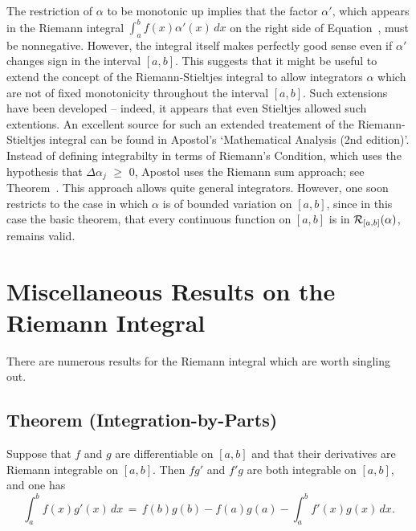        The restriction of ${\alpha}$ to be monotonic up implies that the factor ${\alpha}'$,
    which appears in the Riemann integral ${\displaystyle \int_{a}^{b} f(x){\alpha}'(x)\,dx}$ on the right side of Equation~,
    must be nonnegative. However, the integral itself makes perfectly good sense even if ${\alpha}'$ changes sign in the interval $[a,b]$.
    This suggests that it might be useful to extend the concept of the Riemann-Stieltjes integral to allow
    integrators ${\alpha}$ which are not of fixed monotonicity throughout the interval $[a,b]$.
    Such extensions have been developed -- indeed, it appears that even Stieltjes allowed such extentions.
    An excellent source for such an extended treatement of the Riemann-Stieltjes integral can be found in Apostol's `Mathematical Analysis (2nd edition)'.
    Instead of defining integrabilty in terms of Riemann's Condition, which uses the hypothesis that ${\Delta}{\alpha}_{j}\,\,{\geq}\,\,0$,
    Apostol uses the Riemann sum approach; see Theorem~.
    This approach allows quite general integrators. However, one soon restricts to the case in which ${\alpha}$ is of bounded variation on $[a,b]$,
    since in this case the basic theorem, that every continuous function on $[a,b]$ is in ${\cal R}_{[a,b]}({\alpha})$, remains valid.

\V
\V


                \section{{\bf Miscellaneous Results on the Riemann Integral}}
                \label{SectH50}

\V

        There are numerous results for the Riemann integral which are worth singling out.

\V
\V

        \subsection{\small{{\bf Theorem} (Integration-by-Parts)}}
        \label{ThmH50.20}

\V

        Suppose that $f$ and $g$ are differentiable on $[a,b]$ and that their derivatives are Riemann integrable on $[a,b]$.
    Then $fg'$ and $f'g$ are both integrable on $[a,b]$, and one has
        \begin{equation}
        \label{EqnH.40}
        \int_{a}^{b} f(x)g'(x)\,dx \,=\, f(b)g(b) - f(a)g(a) - \int_{a}^{b} f'(x)g(x)\,dx.
        \end{equation}

